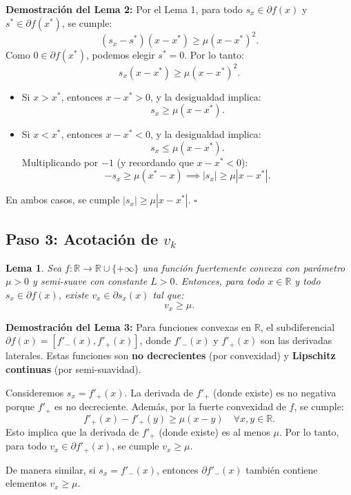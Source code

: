 \documentclass[12pt]{book}
\newtheorem{lemma}{Lema}
\theoremstyle{definition}
\theoremstyle{plain}
\theoremstyle{remark}
\begin{document}
\medskip
\textbf{Demostración del Lema 2:}
Por el Lema 1, para todo \( s_x \in \partial f(x) \) y \( s^* \in \partial f(x^*) \), se cumple:
\[
(s_x - s^*)(x - x^*) \geq \mu (x - x^*)^2.
\]
Como \( 0 \in \partial f(x^*) \), podemos elegir \( s^* = 0 \). Por lo tanto:
\[
s_x (x - x^*) \geq \mu (x - x^*)^2.
\]
\begin{itemize}
    \item Si \( x > x^* \), entonces \( x - x^* > 0 \), y la desigualdad implica:
      \[
      s_x \geq \mu (x - x^*).
      \]
    \item Si \( x < x^* \), entonces \( x - x^* < 0 \), y la desigualdad implica:
      \[
      s_x \leq \mu (x - x^*).
      \]
      Multiplicando por \( -1 \) (y recordando que \( x - x^* < 0 \)):
      \[
      -s_x \geq \mu (x^* - x) \implies |s_x| \geq \mu |x - x^*|.
      \]
\end{itemize}
En ambos casos, se cumple \( |s_x| \geq \mu |x - x^*| \). \hfill \(\square\)

\subsection*{Paso 3: Acotación de \( v_k \)}

\begin{lemma}
Sea \( f: \mathbb{R} \to \mathbb{R} \cup \{+\infty\} \) una función fuertemente convexa con parámetro \( \mu > 0 \) y semi-suave con constante \( L > 0 \). Entonces, para todo \( x \in \mathbb{R} \) y todo \( s_x \in \partial f(x) \), existe \( v_x \in \partial s_x(x) \) tal que:
\[
v_x \geq \mu.
\]
\end{lemma}

\medskip
\textbf{Demostración del Lema 3:}
Para funciones convexas en \( \mathbb{R} \), el subdiferencial \( \partial f(x) = [f'_-(x), f'_+(x)] \), donde \( f'_-(x) \) y \( f'_+(x) \) son las derivadas laterales. Estas funciones son \textbf{no decrecientes} (por convexidad) y \textbf{Lipschitz continuas} (por semi-suavidad).

\medskip
Consideremos \( s_x = f'_+(x) \). La derivada de \( f'_+ \) (donde existe) es no negativa porque \( f'_+ \) es no decreciente. Además, por la fuerte convexidad de \( f \), se cumple:
\[
f'_+(x) - f'_+(y) \geq \mu (x - y) \quad \forall x, y \in \mathbb{R}.
\]
Esto implica que la derivada de \( f'_+ \) (donde existe) es al menos \( \mu \). Por lo tanto, para todo \( v_x \in \partial f'_+(x) \), se cumple \( v_x \geq \mu \).

\medskip
De manera similar, si \( s_x = f'_-(x) \), entonces \( \partial f'_-(x) \) también contiene elementos \( v_x \geq \mu \).
\end{document}
